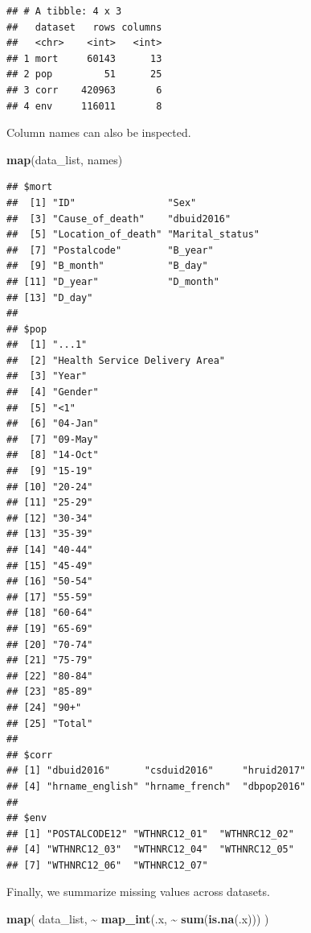 \documentclass[
  11pt,
  oneside]{book}
\newenvironment{Shaded}{\begin{snugshade}}{\end{snugshade}}
\newcommand{\FunctionTok}[1]{\textcolor[rgb]{0.13,0.29,0.53}{\textbf{#1}}}
\newcommand{\NormalTok}[1]{#1}
\newcommand{\SpecialCharTok}[1]{\textcolor[rgb]{0.81,0.36,0.00}{\textbf{#1}}}
\begin{document}
\begin{verbatim}
## # A tibble: 4 x 3
##   dataset   rows columns
##   <chr>    <int>   <int>
## 1 mort     60143      13
## 2 pop         51      25
## 3 corr    420963       6
## 4 env     116011       8
\end{verbatim}

Column names can also be inspected.

\begin{Shaded}
\begin{Highlighting}[]
\FunctionTok{map}\NormalTok{(data\_list, names)}
\end{Highlighting}
\end{Shaded}

\begin{verbatim}
## $mort
##  [1] "ID"                "Sex"              
##  [3] "Cause_of_death"    "dbuid2016"        
##  [5] "Location_of_death" "Marital_status"   
##  [7] "Postalcode"        "B_year"           
##  [9] "B_month"           "B_day"            
## [11] "D_year"            "D_month"          
## [13] "D_day"            
## 
## $pop
##  [1] "...1"                        
##  [2] "Health Service Delivery Area"
##  [3] "Year"                        
##  [4] "Gender"                      
##  [5] "<1"                          
##  [6] "04-Jan"                      
##  [7] "09-May"                      
##  [8] "14-Oct"                      
##  [9] "15-19"                       
## [10] "20-24"                       
## [11] "25-29"                       
## [12] "30-34"                       
## [13] "35-39"                       
## [14] "40-44"                       
## [15] "45-49"                       
## [16] "50-54"                       
## [17] "55-59"                       
## [18] "60-64"                       
## [19] "65-69"                       
## [20] "70-74"                       
## [21] "75-79"                       
## [22] "80-84"                       
## [23] "85-89"                       
## [24] "90+"                         
## [25] "Total"                       
## 
## $corr
## [1] "dbuid2016"      "csduid2016"     "hruid2017"     
## [4] "hrname_english" "hrname_french"  "dbpop2016"     
## 
## $env
## [1] "POSTALCODE12" "WTHNRC12_01"  "WTHNRC12_02" 
## [4] "WTHNRC12_03"  "WTHNRC12_04"  "WTHNRC12_05" 
## [7] "WTHNRC12_06"  "WTHNRC12_07"
\end{verbatim}

Finally, we summarize missing values across datasets.

\begin{Shaded}
\begin{Highlighting}[]
\FunctionTok{map}\NormalTok{(}
\NormalTok{  data\_list,}
  \SpecialCharTok{\textasciitilde{}} \FunctionTok{map\_int}\NormalTok{(.x, }\SpecialCharTok{\textasciitilde{}} \FunctionTok{sum}\NormalTok{(}\FunctionTok{is.na}\NormalTok{(.x)))}
\NormalTok{)}
\end{Highlighting}
\end{Shaded}
\end{document}
